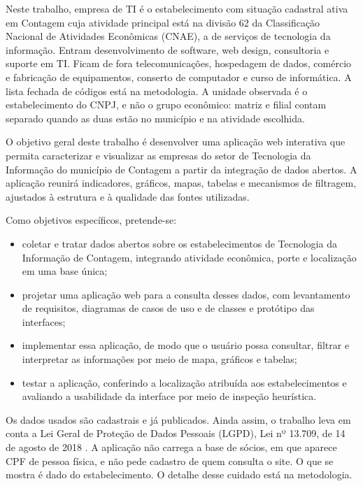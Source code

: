 Neste trabalho, empresa de TI é o estabelecimento com situação cadastral ativa em Contagem cuja atividade principal está na divisão 62 da Classificação Nacional de Atividades Econômicas (CNAE), a de serviços de tecnologia da informação.
Entram desenvolvimento de software, web design, consultoria e suporte em TI.
Ficam de fora telecomunicações, hospedagem de dados, comércio e fabricação de equipamentos, conserto de computador e curso de informática.
A lista fechada de códigos está na metodologia.
A unidade observada é o estabelecimento do CNPJ, e não o grupo econômico: matriz e filial contam separado quando as duas estão no município e na atividade escolhida.

O objetivo geral deste trabalho é desenvolver uma aplicação web interativa que permita caracterizar e visualizar as empresas do setor de Tecnologia da Informação do município de Contagem a partir da integração de dados abertos.
A aplicação reunirá indicadores, gráficos, mapas, tabelas e mecanismos de filtragem, ajustados à estrutura e à qualidade das fontes utilizadas.

Como objetivos específicos, pretende-se:

\begin{itemize}
    \item coletar e tratar dados abertos sobre os estabelecimentos de Tecnologia da Informação de Contagem, integrando atividade econômica, porte e localização em uma base única;
    \item projetar uma aplicação web para a consulta desses dados, com levantamento de requisitos, diagramas de casos de uso e de classes e protótipo das interfaces;
    \item implementar essa aplicação, de modo que o usuário possa consultar, filtrar e interpretar as informações por meio de mapa, gráficos e tabelas;
    \item testar a aplicação, conferindo a localização atribuída aos estabelecimentos e avaliando a usabilidade da interface por meio de inspeção heurística.
\end{itemize}

Os dados usados são cadastrais e já publicados. Ainda assim, o trabalho leva em conta a Lei Geral de Proteção de Dados Pessoais (LGPD), Lei nº 13.709, de 14 de agosto de 2018 \cite{brasil2018}.
A aplicação não carrega a base de sócios, em que aparece CPF de pessoa física, e não pede cadastro de quem consulta o site.
O que se mostra é dado do estabelecimento. O detalhe desse cuidado está na metodologia.

